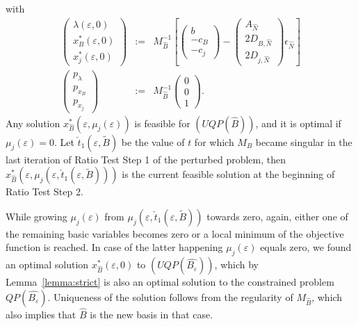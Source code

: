 \documentclass[a4paper]{article}
\begin{document}
with
\begin{eqnarray}
\label{def:sol_eps_zero_II}
\left(\begin{array}{c}
         \lambda\left(\varepsilon, 0\right) \\
	 \hline
	 x_{B}^{*}\left(\varepsilon, 0\right) \\
	 \hline
	 x_{j}^{*}\left(\varepsilon, 0\right)
       \end{array}
\right)
&:=&M_{\hat{B}}^{-1}
\left[
  \left(\begin{array}{c}
          b \\
	  \hline
	  -c_{B} \\
	  \hline
	  -c_{j}
	\end{array}
   \right)
   -
   \left(\begin{array}{c}
           A_{\hat{N}} \\
	   \hline
	   2D_{B, \hat{N}} \\
	   \hline
	   2D_{j, \hat{N}}
	 \end{array}
   \right)\epsilon_{\hat{N}}
\right]
\\
\left(\begin{array}{c}
        p_{\lambda} \\
	\hline
	p_{x_{B}} \\
	\hline
	p_{x_{j}}
       \end{array}
\right)
&:=&M_{\hat{B}}^{-1}
\left(\begin{array}{c}
        0  \\
	\hline
	0  \\
	\hline
	1
       \end{array}
\right).
\end{eqnarray}
Any solution
$x_{\hat{B}}^{*}\left(\varepsilon,\mu_{j}\left(\varepsilon\right)\right)$ is
feasible for $(UQP(\hat{B}))$, and it is optimal if
$\mu_{j}\left(\varepsilon\right)=0$.
Let $\check{t}_{1}(\varepsilon, \tilde{B})$ be the value of $t$
for which $M_{B}$ became singular in the last iteration of Ratio Test Step 1
of the perturbed problem, then
$x_{\hat{B}}^{*}(\varepsilon, 
\mu_{j}(\varepsilon, \check{t}_{1}(\varepsilon, \tilde{B})))$
is the current feasible solution at the beginning of Ratio Test Step 2. 

While growing $\mu_{j}(\varepsilon)$ from
$\mu_{j}(\varepsilon,\check{t}_{1}(\varepsilon, \tilde{B})
)$
towards zero,
again, either one of the remaining basic variables becomes zero or a local
minimum of the objective function is reached. In case of the latter happening
$\mu_{j}(\varepsilon)$ equals zero, we found an optimal solution
$x_{\hat{B}}^{*}\left(\varepsilon, 0\right)$ to $(UQP(\hat{B_{\varepsilon}}))$,
which by
Lemma~\ref{lemma:strict} is also an optimal solution to the constrained
problem
$QP(\hat{B_{\varepsilon}})$. Uniqueness of the solution follows from the
regularity of $M_{\hat{B}}$, which also implies that $\hat{B}$ is the new basis
in that case.
\end{document}
